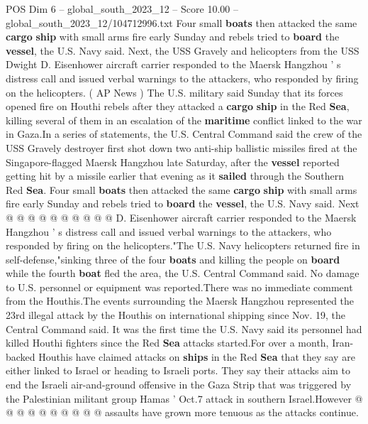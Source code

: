 \begin{textsample}{POS Dim 6 – global\_south\_2023\_12 – Score 10.00 – global\_south\_2023\_12/104712996.txt}  \label{ex:f6_pos_122}
Four small \textbf{boats} then attacked the same \textbf{cargo} \textbf{ship} with small arms fire early Sunday and rebels tried to \textbf{board} the \textbf{vessel}, the U.S.
Navy said.
Next, the USS Gravely and helicopters from the USS Dwight D.
Eisenhower aircraft carrier responded to the Maersk Hangzhou ' s distress call and issued verbal warnings to the attackers, who responded by firing on the helicopters. ( AP News ) The U.S. military said Sunday that its forces opened fire on Houthi rebels after they attacked a \textbf{cargo} \textbf{ship} in the Red \textbf{Sea}, killing several of them in an escalation of the \textbf{maritime} conflict linked to the war in Gaza.In a series of statements, the U.S.
Central Command said the crew of the USS Gravely destroyer first shot down two anti-ship ballistic missiles fired at the Singapore-flagged Maersk Hangzhou late Saturday, after the \textbf{vessel} reported getting hit by a missile earlier that evening as it \textbf{sailed} through the Southern Red \textbf{Sea}.
Four small \textbf{boats} then attacked the same \textbf{cargo} \textbf{ship} with small arms fire early Sunday and rebels tried to \textbf{board} the \textbf{vessel}, the U.S.
Navy said.
Next @ @ @ @ @ @ @ @ @ @ D.
Eisenhower aircraft carrier responded to the Maersk Hangzhou ' s distress call and issued verbal warnings to the attackers, who responded by firing on the helicopters."The U.S.
Navy helicopters returned fire in self-defense,"sinking three of the four \textbf{boats} and killing the people on \textbf{board} while the fourth \textbf{boat} fled the area, the U.S.
Central Command said.
No damage to U.S. personnel or equipment was reported.There was no immediate comment from the Houthis.The events surrounding the Maersk Hangzhou represented the 23rd illegal attack by the Houthis on international shipping since Nov. 19, the Central Command said.
It was the first time the U.S.
Navy said its personnel had killed Houthi fighters since the Red \textbf{Sea} attacks started.For over a month, Iran-backed Houthis have claimed attacks on \textbf{ships} in the Red \textbf{Sea} that they say are either linked to Israel or heading to Israeli ports.
They say their attacks aim to end the Israeli air-and-ground offensive in the Gaza Strip that was triggered by the Palestinian militant group Hamas ' Oct.7 attack in southern Israel.However @ @ @ @ @ @ @ @ @ @ assaults have grown more tenuous as the attacks continue.

\end{textsample}
